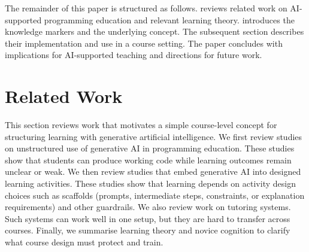 \documentclass{article}
\begin{document}
The remainder of this paper is structured as follows.  reviews related work on AI-supported programming education and relevant learning theory.  introduces the knowledge markers and the underlying concept. The subsequent section describes their implementation and use in a course setting. The paper concludes with implications for AI-supported teaching and directions for future work.

\section{Related Work}
\label{sec:related-work}
This section reviews work that motivates a simple course-level concept for structuring learning with generative artificial intelligence.
We first review studies on unstructured use of generative AI in programming education. These studies show that students can produce working code while learning outcomes remain unclear or weak. We then review studies that embed generative AI into designed learning activities. These studies show that learning depends on activity design choices such as scaffolds (prompts, intermediate steps, constraints, or explanation requirements) and other guardrails. We also review work on tutoring systems. Such systems can work well in one setup, but they are hard to transfer across courses. Finally, we summarise learning theory and novice cognition to clarify what course design must protect and train.
\end{document}

